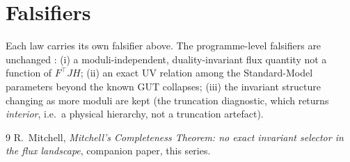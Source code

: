 \documentclass[11pt]{article}
\newcommand{\flux}{F}
\newcommand{\hh}{H}
\begin{document}
\section{Falsifiers}

Each law carries its own falsifier above. The programme-level falsifiers are unchanged
\cite{constraint-first}: (i) a moduli-independent, duality-invariant flux quantity not
a function of $\flux^\top J\hh$; (ii) an exact UV relation among the Standard-Model
parameters beyond the known GUT collapses; (iii) the invariant structure changing as
more moduli are kept (the truncation diagnostic, which returns \emph{interior}, i.e.\ a
physical hierarchy, not a truncation artefact).

\begin{thebibliography}{9}
 R.~Mitchell, \emph{Mitchell's Completeness Theorem: no exact
invariant selector in the flux landscape}, companion paper, this series.
\end{thebibliography}
\end{document}
